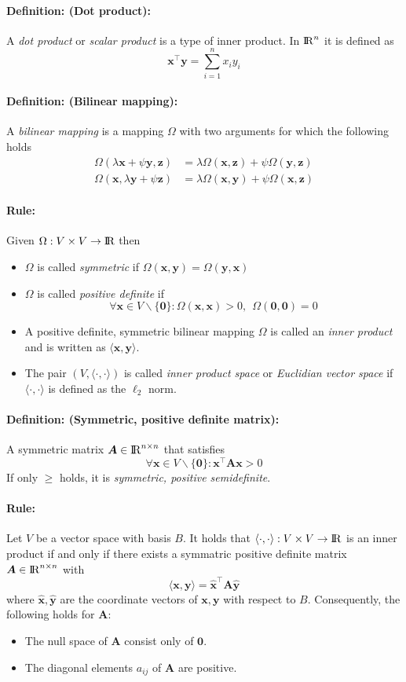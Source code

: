 \documentclass[12pt]{article}
\newcommand{\R}{{\rm I\!R}}
\newcommand{\bx}{{\bm{x}}}
\newcommand{\by}{{\bm{y}}}
\newcommand{\bz}{{\bm{z}}}
\newcommand{\A}{{\bm{A}}}
\newcommand{\0}[0]{\bm{0}}
\newcommand{\ipr}[1]{\langle #1 \rangle}
\newcommand{\xdefinition}[2]{\paragraph{\colorbox{#1!30}{\textbf{Definition:}} (#2):}}
\newcommand{\xrule}[1]{\paragraph{\colorbox{#1!30}{\textbf{Rule:}}}}
\begin{document}
\xdefinition{blue}{Dot product} A \textit{dot product} or \textit{scalar product} is a type of inner product. In $\R^n$ it is defined as
%
\begin{equation}
	\bx^\top \by = \sum\limits_{i=1}^{n} x_i y_i
\end{equation}

\xdefinition{green}{Bilinear mapping} A \textit{bilinear mapping} is a mapping $\Omega$ with two arguments for which the following holds
%
\begin{equation}
\begin{aligned}
	\Omega(\lambda \bx + \psi \by, \bz) &= \lambda \Omega(\bx, \bz) + \psi\Omega(\by, \bz) \\
	\Omega(\bx, \lambda \by + \psi\bz) &= \lambda \Omega(\bx, \by) + \psi\Omega(\bx, \bz)
\end{aligned}
\end{equation}

\xrule{blue} Given $\Omega : V \times V \rightarrow \R$ then
%
\begin{itemize}
	\item $\Omega$ is called \textit{symmetric} if $\Omega(\bx, \by) = \Omega(\by, \bx)$
	\item $\Omega$ is called \textit{positive definite} if
	\begin{equation}
		\forall \bx \in V \backslash \{\0\} : \Omega(\bx, \bx) > 0, \ \ \Omega(\0, \0) = 0
	\end{equation}
	\item A positive definite, symmetric bilinear mapping $\Omega$ is called an \textit{inner product} and is written as $\ipr{\bx, \by}$.
	\item The pair $(V, \ipr{\cdot, \cdot})$ is called \textit{inner product space} or \textit{Euclidian vector space} if $\ipr{\cdot, \cdot}$ is defined as the $\ell_2$ norm.
\end{itemize}

\xdefinition{blue}{Symmetric, positive definite matrix} A symmetric matrix $\A \in \R^{n \times n}$ that satisfies
%
\begin{equation}
	\forall \bx \in V \backslash \{\0\} : \bx^\top \A \bx > 0
\end{equation}
%
If only $\geqslant$ holds, it is \textit{symmetric, positive semidefinite}.

\xrule{blue} Let $V$ be a vector space with basis $B$. It holds that $\ipr{\cdot, \cdot} : V \times V \rightarrow \R$ is an inner product if and only if there exists a symmatric positive definite matrix $\A \in \R^{n \times n}$ with
%
\begin{equation}
	\ipr{\bx, \by} = \hat{\bx}^\top \A \hat{\by}
\end{equation}
%
where $\hat{\bx}, \hat{\by}$ are the coordinate vectors of $\bx, \by$ with respect to $B$. Consequently, the following holds for $\A$:
%
\begin{itemize}
	\item The null space of $\A$ consist only of $\0$.
	\item The diagonal elements $a_{ij}$ of $\A$ are positive.
\end{itemize}
\end{document}
